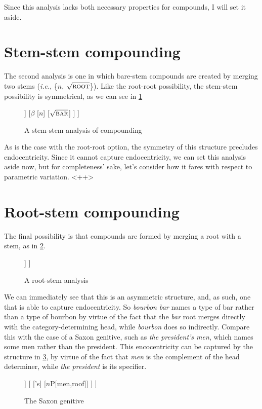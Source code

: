 \documentclass[MilwayThesis]{subfiles}
\begin{document}
Since this analysis lacks both necessary properties for compounds, I will set it aside.
\section{Stem-stem compounding}
The second analysis is one in which bare-stem compounds are created by merging two stems (\textit{i.e.}, \{$n$, $\sqrt{\textsc{root}}$\}).
Like the root-root possibility, the stem-stem possibility is symmetrical, as we can see in \cref{fig:StemStem}
\begin{figure}[h]
	\centering
	\begin{forest}
		[$\gamma$
			[$\alpha$
				[$n$]
				[$\sqrt{\textsc{bourbon}}$]
			]
			[$\beta$
				[$n$]
				[$\sqrt{\textsc{bar}}$]
			]
		]
	\end{forest}
	\caption{A stem-stem analysis of compounding}
	\label{fig:StemStem}
\end{figure}
As is the case with the root-root option, the symmetry of this structure precludes endocentricity.
Since it cannot capture endocentricity, we can set this analysis aside now, but for completeness' sake, let's consider how it fares with respect to parametric variation.
<++>

\section{Root-stem compounding}
The final possibility is that compounds are formed by merging a root with a stem, as in \cref{fig:RootStem}.
\begin{figure}[h]
	\centering
	\begin{forest}
		[$\beta$
			[$\sqrt{\textsc{bourbon}}$]
			[$\alpha$
				[$n$]
				[$\sqrt{\textsc{bar}}$]
			]
		]
	\end{forest}
	\caption{A root-stem analysis}
	\label{fig:RootStem}
\end{figure}
We can immediately see that this is an asymmetric structure, and, as such, one that is able to capture endocentricity.
So \textit{bourbon bar} names a type of bar rather than a type of bourbon by virtue of the fact that the \textit{bar} root merges directly with the category-determining head, while \textit{bourbon} does so indirectly.
Compare this with the case of a Saxon genitive, such as \textit{the president's men}, which names some men rather than the president.
This encocentricity can be captured by the structure in \cref{fig:SaxonGenitive}, by virtue of the fact that \textit{men} is the complement of the head determiner, while \textit{the president} is its specifier.
\begin{figure}[h]
	\centering
	\begin{forest}
		[DP
			[DP[the president,roof]]
			[
				['s]
				[$n$P[men,roof]]
			]
		]
	\end{forest}
	\caption{The Saxon genitive}
	\label{fig:SaxonGenitive}
\end{figure}
\end{document}
